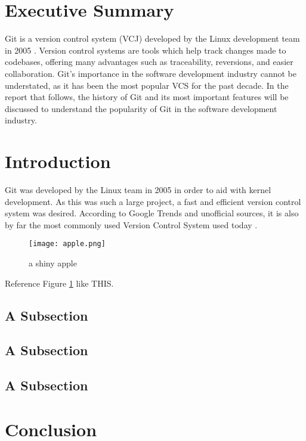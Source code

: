 


\section{Executive Summary}

Git is a version control system (VCJ) developed by the Linux development team  in 2005 \cite{git-short-history}.
Version control systems are tools which help track changes made to codebases, offering many advantages such as traceability, reversions, and easier collaboration.
Git's importance in the software development industry cannot be understated, as it has been the most popular VCS for the past decade.
In the report that follows, the history of Git and its most important features will be discussed to understand the popularity of Git in the software development industry.

\section{Introduction}

Git was developed by the Linux team in 2005 in order to aid with kernel development.
As this was such a large project, a fast and efficient version control system was desired.
According to Google Trends and unofficial sources, it is also by far the most commonly used Version Control System used today \cite{vcs-stats}\cite{vcs-google-trends}.

\begin{figure}[H]
    \centering
    \texttt{[image: apple.png]}
    \caption{a shiny apple}
    \label{fig:apple1}
\end{figure}

Reference Figure \ref{fig:apple1} like THIS.


\subsection{A Subsection}

\subsection{A Subsection}


\subsection{A Subsection}


\section{Conclusion}

\lipsum[16]

\newpage



